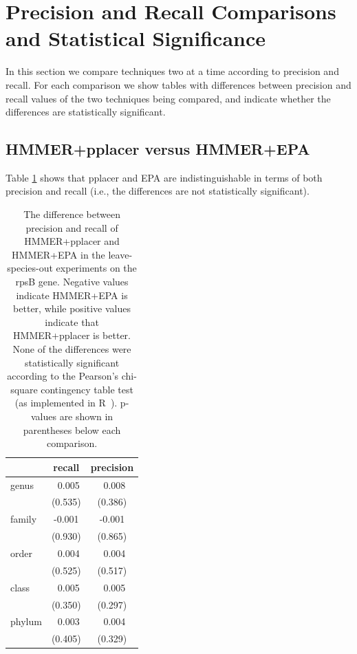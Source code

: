 \section{Precision and Recall Comparisons and Statistical Significance}
In this section we compare techniques two at a time according to precision and recall.
For each comparison we show tables with differences between precision and recall values of the two techniques being compared,
and indicate whether the differences are statistically significant. 

\subsection{HMMER+pplacer versus HMMER+EPA}\label{supp:hmmer_epa}
Table \ref{tipp:difference.leaveout.rspb.pplacer.epa} shows that 
pplacer and EPA are indistinguishable in terms of both precision and recall
(i.e., the differences are not statistically significant).

\begin{table}[hptb]
\caption[Precision-Recall Differences between HMMER+pplacer and HMMER+EPA on the rpsB gene]{\label{tipp:difference.leaveout.rspb.pplacer.epa}
The difference between precision and recall of HMMER+pplacer and HMMER+EPA in the leave-species-out experiments on the rpsB gene. 
Negative values indicate HMMER+EPA is better, while positive values indicate that HMMER+pplacer is better.
None of the differences were statistically significant according to the Pearson's chi-square contingency table test (as implemented in R~\cite{R}).
p-values are shown in parentheses below each comparison.  
 }
\begin{center}
\begin{tabular}{|l||c|c|} \hline
\multicolumn{1}{|l||}{}&\multicolumn{1}{c|}{recall}&\multicolumn{1}{c|}{precision}\\ \hline
genus&~0.005&~0.008\\ 
&(0.535)&(0.386)\\ 
family&-0.001&-0.001\\ 
&(0.930)&(0.865)\\ 
order&~0.004&~0.004\\ 
&(0.525)&(0.517)\\ 
class&~0.005&~0.005\\ 
&(0.350)&(0.297)\\ 
phylum&~0.003&~0.004\\ 
&(0.405)&(0.329)\\ 
\hline
\end{tabular}
\end{center}
\end{table}


